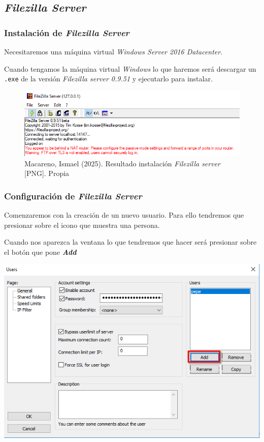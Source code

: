 \documentclass[11pt]{article}
\begin{document}
\subsection{\emph{Filezilla Server}}
\label{sec:org5ac565b}
\subsubsection{Instalación de \emph{Filezilla Server}}
\label{sec:org30e7356}
Necesitaremos una máquina virtual \emph{Windows Server 2016 Datacenter}.

Cuando tengamos la máquina virtual \emph{Windows} lo que haremos será descargar un \texttt{.exe} de la versión \emph{Filezilla server 0.9.51} y ejecutarlo para instalar.

\begin{figure}[htbp]
\centering
\includegraphics[width=.9\linewidth]{./media/1.png}
\caption{Macareno, Ismael (2025). Resultado instalación \emph{Filezilla server} [PNG]. Propia}
\end{figure}

\subsubsection{Configuración de \emph{Filezilla Server}}
\label{sec:orgf3ef895}
Comenzaremos con la creación de un nuevo usuario. Para ello tendremos que presionar sobre el icono que muestra una persona.

Cuando nos aparezca la ventana lo que tendremos que hacer será presionar sobre el botón que pone \textbf{\emph{Add}}

\begin{center}
\includegraphics[width=.9\linewidth]{./media/2.png}
\end{center}
\end{document}
